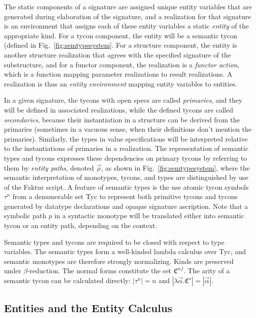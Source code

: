 \documentclass[9pt,nocopyrightspace, fleqn]{sigplanconf}
\begin{document}
The static components of a signature are assigned unique entity variables
that are generated during elaboration of the signature, and a 
realization for that signature is an environment that assigns each of
these entity variables a static \emph{entity} of the appropriate kind.
For a tycon component, the entity will be a semantic tycon (defined
in Fig.~\ref{fig:semtypesystem}.  For a structure component, the
entity is another structure realization that agrees with the specified
signature of the substructure, and for a functor component, the
realization is a \emph{functor action}, which is a function mapping
parameter realizations to result realizations. A realization is thus
an \emph{entity environment} mapping entity variables to entities.


 
In a given signature, the tycons with open specs are called
\emph{primaries}, and they will be defined in associated realizations,
while the defined tycons are called \emph{secondaries}, because their
instantiation in a structure can be derived from the primaries
(sometimes in a vacuous sense, when their definitions don't mention
the primaries).  Similarly, the types in value specifications will be
interpreted relative to the instantiations of primaries in a
realization.  The representation of semantic types and tycons
expresses these dependencies on primary tycons by referring to them by
\emph{entity paths}, denoted $\vec{\rho}$, as shown in
Fig.~\ref{fig:semtypesystem}, where the semantic interpretation of
monotypes, tycons, and types are distinguished by use of the Faktur
script.  A feature of semantic types is the use atomic tycon symbols
$\tau^n$ from a denumerable set Tyc to represent both primitive tycons
and tycons generated by datatype declarations and opaque signature
ascription.  Note that a symbolic path $p$ in a syntactic
monotype will be translated either into semantic tycon or an entity
path, depending on the context.

Semantic types and tycons are required to be closed with respect to
type variables. The semantic types form a well-kinded lambda calculus
over Tyc, and semantic monotypes are therefore strongly
normalizing. Kinds are preserved under $\beta$-reduction. The normal
forms constitute the set $\mathfrak{C}^{nf}$.  The arity of a semantic
tycon can be calculated directly: $|\tau^n| = n$ and
$|\lambda\vec{\alpha}.\mathfrak{C}^s| = |\vec{\alpha}|$.

\subsection{Entities and the Entity Calculus}
 
\end{document}
